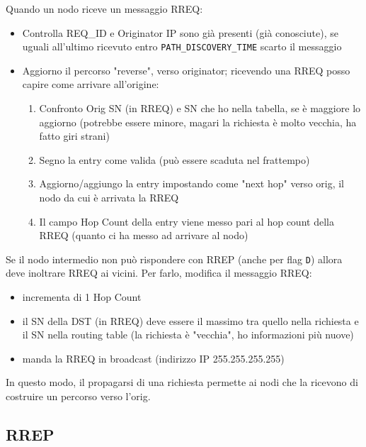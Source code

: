 Quando un nodo riceve un messaggio RREQ:
\begin{itemize}
	\item Controlla REQ\_ID e Originator IP sono già presenti (già conosciute), se uguali all'ultimo ricevuto entro \texttt{PATH\_DISCOVERY\_TIME} scarto il messaggio
	\item Aggiorno il percorso "reverse", verso originator; ricevendo una RREQ posso capire come arrivare all'origine:
	\begin{enumerate}
		\item Confronto Orig SN (in RREQ) e SN che ho nella tabella, se è maggiore lo aggiorno (potrebbe essere minore, magari la richiesta è molto vecchia, ha fatto giri strani)
		\item Segno la entry come valida (può essere scaduta nel frattempo)
		\item Aggiorno/aggiungo la entry impostando come "next hop" verso orig, il nodo da cui è arrivata la RREQ
		\item Il campo Hop Count della entry viene messo pari al hop count della RREQ (quanto ci ha messo ad arrivare al nodo)
	\end{enumerate}
\end{itemize}


Se il nodo intermedio non può rispondere con RREP (anche per flag \texttt{D}) allora deve inoltrare RREQ ai vicini. Per farlo, modifica il messaggio RREQ:
\begin{itemize}
	\item incrementa di 1 Hop Count
	\item il SN della DST (in RREQ) deve essere il massimo tra quello nella richiesta e il SN nella routing table (la richiesta è "vecchia", ho informazioni più nuove)
	\item manda la RREQ in broadcast (indirizzo IP 255.255.255.255)
\end{itemize}
In questo modo, il propagarsi di una richiesta permette ai nodi che la ricevono di costruire un percorso verso l'orig.\\

\subsection{RREP}

